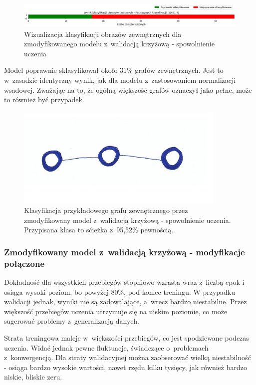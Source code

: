 \begin{figure}[ht]
	\centering
	\includegraphics[width=14cm]{resources/tests/images/v4/crossvalid_4_bar.png}
	\caption{Wizualizacja klasyfikacji obrazów zewnętrznych dla zmodyfikowanego modelu z~walidacją krzyżową - spowolnienie uczenia}
	\label{Fig:tests-cv-4c}
\end{figure}
\FloatBarrier

Model poprawnie sklasyfikował około 31\% grafów zewnętrznych.
Jest to w~zasadzie identyczny wynik, jak dla modelu z~zastosowaniem normalizacji wsadowej.
Zważając na to, że ogólną większość grafów oznaczył jako pełne, może to również być przypadek.

\begin{figure}[ht]
	\centering
	\includegraphics[width=10cm]{../graph_classification/test_graphs/drawn/path-10.png}
	\caption{Klasyfikacja przykładowego grafu zewnętrznego przez zmodyfikowany model z~walidacją krzyżową - spowolnienie uczenia.
		Przypisana klasa to sćieżka z~95,52\% pewnością.}
	\label{Fig:tests-cv-4d}
\end{figure}
\FloatBarrier

\subsubsection{Zmodyfikowany model z~walidacją krzyżową - modyfikacje połączone}

Dokładność dla wszystkich przebiegów stopniowo wzrasta wraz z~liczbą epok
i osiąga wysoki poziom, bo powyżej 80\%, pod koniec treningu.
W przypadku walidacji jednak, wyniki nie są zadowalające, a~wrecz bardzo niestabilne.
Przez większość przebiegów uczenia utrzymuje się na niskim poziomie,
co może sugerować problemy z~generalizacją danych.

Strata treningowa maleje w~większości przebiegów, co jest spodziewane podczas uczenia.
Widać jednak pewne fluktuacje, świadczące o~problemach z~konwergencją.
Dla straty walidacyjnej można zaobserować wielką niestabilność - osiąga bardzo wysokie wartości,
nawet rzędu kilku tysięcy, jak również bardzo niskie, bliskie zeru.

